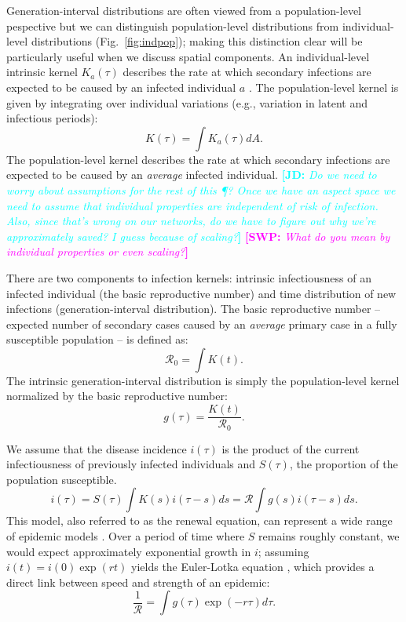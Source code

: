 \documentclass[12pt]{article}
\newcommand{\fref}[1]{Fig.~\ref{fig:#1}}
\newcommand{\RR}{\ensuremath{{\mathcal R}}}
\newcommand{\comment}[3]{\textcolor{#1}{\textbf{[#2: }\textsl{#3}\textbf{]}}}
\newcommand{\jd}[1]{\comment{cyan}{JD}{#1}}
\newcommand{\swp}[1]{\comment{magenta}{SWP}{#1}}
\begin{document}
Generation-interval distributions are often viewed from a population-level pespective but we can distinguish population-level distributions from individual-level distributions (\fref{indpop}); 
making this distinction clear will be particularly useful when we discuss spatial components.
An individual-level intrinsic kernel $K_a(\tau)$ describes the rate at which secondary infections are expected to be caused by an infected individual $a$ \citep{svensson2007note, svensson2015influence}.
The population-level kernel is given by integrating over individual variations (e.g., variation in latent and infectious periods):
\begin{equation}
K(\tau) = \int K_a (\tau) dA.
\end{equation}
The population-level kernel describes the rate at which secondary infections are expected to be caused by an \emph{average} infected individual.
\jd{Do we need to worry about assumptions for the rest of this \P? Once we have an aspect space we need to assume that individual properties are independent of risk of infection. Also, since that's wrong on our networks, do we have to figure out why we're approximately saved? I guess because of scaling?}
\swp{What do you mean by individual properties or even scaling?}

There are two components to infection kernels: intrinsic infectiousness of an infected individual (the basic reproductive number) and time distribution of new infections (generation-interval distribution).
The basic reproductive number -- expected number of secondary cases caused by an \emph{average} primary case in a fully susceptible population -- is defined as: 
\begin{equation}
\RR_0 = \int K(t).
\end{equation}
The intrinsic generation-interval distribution is simply the population-level kernel normalized by the basic reproductive number:
\begin{equation}
g(\tau) = \frac{K(t)}{\RR_0}.
\end{equation}

We assume that the disease incidence $i(\tau)$ is the product of the current infectiousness of previously infected individuals and $S(\tau)$, the proportion of the population susceptible.
\begin{equation}
i(\tau) = S(\tau) \int K(s) i(\tau-s) ds = \RR \int g(s) i(\tau-s) ds.
\end{equation}
This model, also referred to as the renewal equation, can represent a wide range of epidemic models \citep{heesterbeek1996concept, diekmann2000mathematical, roberts2004modelling, aldis2005integral, wallinga2007generation, roberts2007model}.
Over a period of time where $S$ remains roughly constant, we would expect approximately exponential growth in $i$; assuming $i(t) = i(0) \exp(r t)$ yields the Euler-Lotka equation \citep{lotka1907relation}, which provides a direct link between speed and strength of an epidemic:
\begin{equation}
\frac{1}{\RR} = \int g(\tau) \exp(-r \tau) d\tau.
\end{equation}
\end{document}
